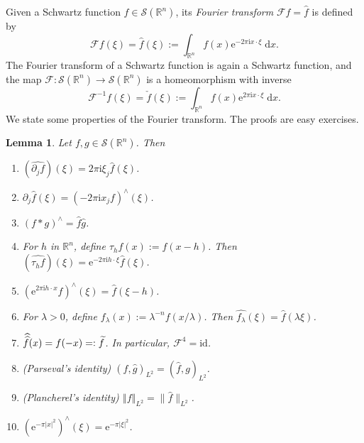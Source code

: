 \documentclass{book}
\newcommand{\scrF}{\mathscr{F}}
\newcommand{\scrS}{\mathscr{S}}
\newcommand{\bbR}{\mathbb{R}}
\renewcommand{\d}{\mathrm{d}}
\newcommand{\e}{\mathrm{e}}
\renewcommand{\i}{\mathrm{i}}
\newcommand{\id}{\mathrm{id}}
\newcommand{\abs}[1]{\left\lvert {#1} \right\rvert}
\newcommand{\norm}[1]{\left\Vert {#1} \right\Vert}
\newtheorem{lemma}[theorem]{Lemma}
\theoremstyle{definition}
\theoremstyle{remark}
\numberwithin{equation}{chapter}
\begin{document}
Given a Schwartz function $f \in \scrS(\bbR^n)$, its \textit{Fourier transform} $\scrF f = \widehat{f}$ is defined by
\begin{equation}
    \scrF f(\xi) = \widehat{f}(\xi) := \int_{\bbR^n} f(x)\e^{-2\pi\i x \cdot \xi} \; \d x.
\end{equation}
The Fourier transform of a Schwartz function is again a Schwartz function, and the map $\scrF \colon \scrS(\bbR^n) \to \scrS(\bbR^n)$ is a homeomorphism with inverse 
\begin{equation}
    \scrF^{-1} f(\xi) = \check{f}(\xi) := \int_{\bbR^n} f(x)\e^{2\pi\i x \cdot \xi} \; \d x.
\end{equation}
We state some properties of the Fourier transform. The proofs are easy exercises.   
\begin{lemma}
    Let $f,g \in \scrS(\bbR^n)$. Then 
    \begin{enumerate}[label=\rm (\roman*)]
        \item $(\widehat{\partial_j f})(\xi) = 2\pi\i\xi_j\widehat{f}(\xi)$.
        \item $\partial_j\widehat{f}(\xi) = (-2\pi\i x_j f)^\wedge(\xi)$.
        \item $(f \ast g)^\wedge = \widehat{f}\widehat{g}$.
        \item For $h$ in $\bbR^n$, define $\tau_h f(x) := f(x-h)$. Then $(\widehat{\tau_h f})(\xi) = \e^{-2\pi\i h \cdot \xi} \widehat{f}(\xi)$.
        \item $(\e^{2\pi\i h \cdot x}f)^\wedge(\xi) = \widehat{f}(\xi - h)$.
        \item For $\lambda > 0$, define $f_\lambda(x) := \lambda^{-n}f(x/\lambda)$. Then $\widehat{f_\lambda}(\xi) = \widehat{f}(\lambda \xi)$.
        \item $\skew{5.5}\widehat{\widehat{f}}(x) = f(-x) =: \widetilde{f}$. In particular, $\scrF^4 = \id$.
        \item (Parseval's identity) $(f,\widehat{g})_{L^2} = (\widehat{f},g)_{L^2}$.
        \item (Plancherel's identity) $\norm{f}_{L^2} = \lVert \widehat{f} \rVert_{L^2}$.
        \item $(\e^{-\pi\abs{x}^2})^\wedge(\xi) = \e^{-\pi\abs{\xi}^2}$.
    \end{enumerate}
\end{lemma}
\end{document}
